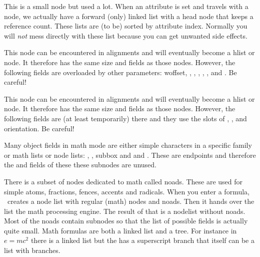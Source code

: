 This is a small node but used a lot. When an attribute is set and travels with a
node, we actually have a forward (only) linked list with a head node that keeps a
reference count. These lists are (to be) sorted by attribute index. Normally you
will {\em not} mess directly with these list because you can get unwanted side
effects.



\stopsubsection

\startsubsection[title={alignrecord}]

This node can be encountered in alignments and will eventually become a \type
{hlist} or  node. It therefore has the same size and fields as those
nodes. However, the following fields are overloaded by other parameters: \type
{woffset}, , , , ,
,  and . Be careful!



\stopsubsection

\startsubsection[title={unset}]

This node can be encountered in alignments and will eventually become a \type
{hlist} or  node. It therefore has the same size and fields as those
nodes. However, the following fields are (at least temporarily) there and they
use the slots of , ,  and \type
{orientation}. Be careful!



\stopsubsection

\stopsection

\startsection[title={Math nodes}]

\startsubsection[title=The concept]

Many object fields in math mode are either simple characters in a specific family
or math lists or node lists: , , {subbox}
and  and . These are endpoints and therefore the
 and  fields of these these subnodes are unused.

There is a subset of nodes dedicated to math called noads. These are used for
simple atoms, fractions, fences, accents and radicals. When you enter a formula,
\TEX\ creates a node list with regular (math) nodes and noads. Then it hands over
the list the math processing engine. The result of that is a nodelist without
noads. Most of the noads contain subnodes so that the list of possible fields is
actually quite small. Math formulas are both a linked list and a tree. For
instance in $e = mc^2$ there is a linked list  but the 
has a superscript branch that itself can be a list with branches.

